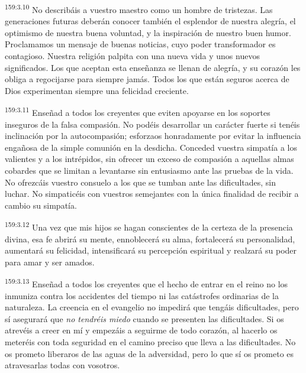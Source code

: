 \par 
\textsuperscript{159:3.10} No describáis a vuestro maestro como un hombre de tristezas. Las generaciones futuras deberán conocer también el esplendor de nuestra alegría, el optimismo de nuestra buena voluntad, y la inspiración de nuestro buen humor. Proclamamos un mensaje de buenas noticias, cuyo poder transformador es contagioso. Nuestra religión palpita con una nueva vida y unos nuevos significados. Los que aceptan esta enseñanza se llenan de alegría, y su corazón les obliga a regocijarse para siempre jamás. Todos los que están seguros acerca de Dios experimentan siempre una felicidad creciente.

\par 
\textsuperscript{159:3.11} Enseñad a todos los creyentes que eviten apoyarse en los soportes inseguros de la falsa compasión. No podéis desarrollar un carácter fuerte si tenéis inclinación por la autocompasión; esforzaos honradamente por evitar la influencia engañosa de la simple comunión en la desdicha. Conceded vuestra simpatía a los valientes y a los intrépidos, sin ofrecer un exceso de compasión a aquellas almas cobardes que se limitan a levantarse sin entusiasmo ante las pruebas de la vida. No ofrezcáis vuestro consuelo a los que se tumban ante las dificultades, sin luchar. No simpaticéis con vuestros semejantes con la única finalidad de recibir a cambio su simpatía.

\par 
\textsuperscript{159:3.12} Una vez que mis hijos se hagan conscientes de la certeza de la presencia divina, esa fe abrirá su mente, ennoblecerá su alma, fortalecerá su personalidad, aumentará su felicidad, intensificará su percepción espiritual y realzará su poder para amar y ser amados.

\par 
\textsuperscript{159:3.13} Enseñad a todos los creyentes que el hecho de entrar en el reino no los inmuniza contra los accidentes del tiempo ni las catástrofes ordinarias de la naturaleza. La creencia en el evangelio no impedirá que tengáis dificultades, pero sí asegurará que \textit{no tendréis miedo} cuando se presenten las dificultades. Si os atrevéis a creer en mí y empezáis a seguirme de todo corazón, al hacerlo os meteréis con toda seguridad en el camino preciso que lleva a las dificultades. No os prometo liberaros de las aguas de la adversidad, pero lo que sí os prometo es atravesarlas todas con vosotros.

